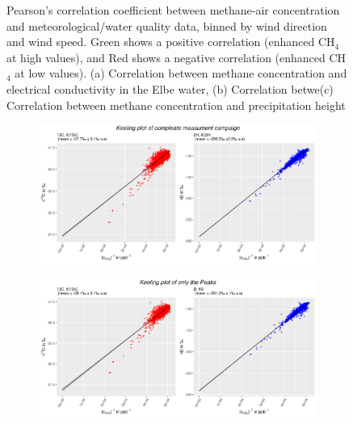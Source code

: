 \begin{figure}[!htb]
\begin{subfigure}[b]{0.8\textwidth}
   \caption[Correlation plot precipitation height]{}
   \label{NoCorrelationPrecipitation}
\end{subfigure}
\caption[Correlation plots showing no correlation with methane concentration in the air]{Pearson's correlation coefficient between methane-air concentration and meteorological/water quality data, binned by wind direction and wind speed. Green shows a positive correlation (enhanced CH$_4$ at high values), and Red shows a negative correlation (enhanced CH$_4$ at low values). (a) Correlation between methane concentration and electrical conductivity in the Elbe water, (b) Correlation betwe(c) Correlation between methane concentration and precipitation height}
\label{NoCorrelationAppendix}
\end{figure}

\begin{figure}[!htb]
\centering
\begin{subfigure}[b]{1\textwidth}
   \includegraphics[width=1\linewidth]{figures/Appendix/Keeling/11_Keeling_Plot_Total_paper_peaks.png}
   \caption[Keeling plots total timeline]{}
   \label{KeelingPaperTotal} 
\end{subfigure}

\begin{subfigure}[b]{1\textwidth}
   \includegraphics[width=1\linewidth]{figures/Appendix/Keeling/11_Keeling_Plot_Peaks_paper_peaks.png}
   \caption[Keeling plots literature peak identification criteria]{}
   \label{KeelingPaperPeaks}
\end{subfigure}


\end{figure}
